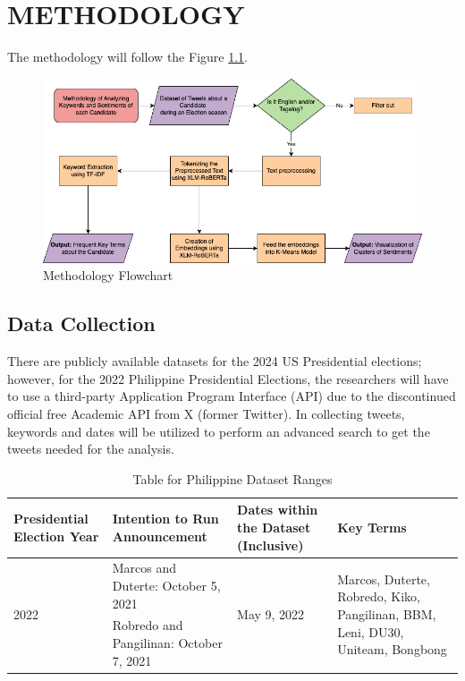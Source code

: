 \chapter{METHODOLOGY}
The methodology will follow the Figure \ref{fig:Methodology}.

\begin{figure}[h]
    \centering
    \includegraphics[width=1\textwidth]{Figures/methodology_flowchart.png}
    \caption{Methodology Flowchart}
    \label{fig:Methodology}
\end{figure}


\section{Data Collection}
There are publicly available datasets for the 2024 US Presidential elections; however, for the 2022 Philippine Presidential Elections, the researchers will have to use a third-party Application Program Interface (API) due to the discontinued official free Academic API from X (former Twitter). In collecting tweets, keywords and dates will be utilized to perform an advanced search to get the tweets needed for the analysis.\newline

\begin{table}[h]
    \centering
    \begin{tabularx}{\textwidth}{X|X|X|X}
        \textbf{Presidential Election Year} & \textbf{Intention to Run Announcement} & \textbf{Dates within the Dataset (Inclusive)} & \textbf{Key Terms}\\
        \hline\hline
        \multirow{2}{*}{2022}& Marcos and Duterte: October 5, 2021 & \multirow{2}{*}{May 9, 2022} & \multirow{2}{4cm}{Marcos, Duterte, Robredo, Kiko, Pangilinan, BBM, Leni, DU30, Uniteam, Bongbong} \\
        & Robredo and Pangilinan: October 7, 2021 & & \\
    \end{tabularx}
    \caption{Table for Philippine Dataset Ranges}
\end{table}

